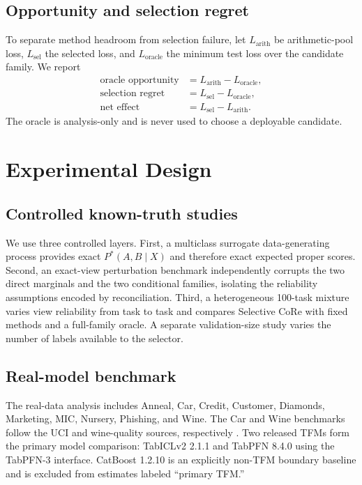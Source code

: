 \documentclass[a4paper,fleqn]{cas-sc}
\begin{document}
\subsection{Opportunity and selection regret}
To separate method headroom from selection failure, let $L_{\mathrm{arith}}$ be arithmetic-pool loss, $L_{\mathrm{sel}}$ the selected loss, and $L_{\mathrm{oracle}}$ the minimum test loss over the candidate family. We report
\begin{align}
\text{oracle opportunity} &= L_{\mathrm{arith}}-L_{\mathrm{oracle}},\\
\text{selection regret} &= L_{\mathrm{sel}}-L_{\mathrm{oracle}},\\
\text{net effect} &= L_{\mathrm{sel}}-L_{\mathrm{arith}}.
\end{align}
The oracle is analysis-only and is never used to choose a deployable candidate.

\section{Experimental Design}
\subsection{Controlled known-truth studies}
We use three controlled layers. First, a multiclass surrogate data-generating process provides exact $P^*(A,B\mid X)$ and therefore exact expected proper scores. Second, an exact-view perturbation benchmark independently corrupts the two direct marginals and the two conditional families, isolating the reliability assumptions encoded by reconciliation. Third, a heterogeneous 100-task mixture varies view reliability from task to task and compares Selective CoRe with fixed methods and a full-family oracle. A separate validation-size study varies the number of labels available to the selector.

\subsection{Real-model benchmark}
The real-data analysis includes Anneal, Car, Credit, Customer, Diamonds, Marketing, MIC, Nursery, Phishing, and Wine. The Car and Wine benchmarks follow the UCI and wine-quality sources, respectively \citep{bohanec1988car,cortez2009wine}. Two released TFMs form the primary model comparison: TabICLv2 2.1.1 and TabPFN 8.4.0 using the TabPFN-3 interface. CatBoost 1.2.10 is an explicitly non-TFM boundary baseline and is excluded from estimates labeled ``primary TFM.''
\end{document}
